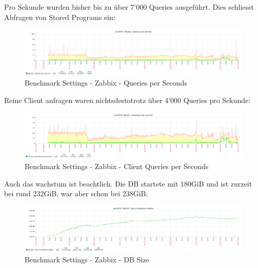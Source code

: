\begin{flushleft}
    Pro Sekunde wurden bisher bis zu über 7'000 Queries ausgeführt.
    Dies schliesst Abfragen von Stored Programs ein:
    \begin{figure}[H]
        \centering
        \includegraphics[width=0.8\linewidth]{source/implementation/evaluation/benchmarking/sks0970_zabbix_mariadb_queries_per_second_graph}
        \caption{Benchmark Settings - Zabbix - Queries per Seconds}
        \label{fig:sks0970_zabbix_mariadb_queries_per_second_graph}
    \end{figure}
    Reine Client anfragen waren nichtsdestotrotz über 4'000 Queries pro Sekunde:
    \begin{figure}[H]
        \centering
        \includegraphics[width=0.8\linewidth]{source/implementation/evaluation/benchmarking/sks0970_zabbix_mariadb_questions_per_second_graph}
        \caption{Benchmark Settings - Zabbix - Client Queries per Seconds}
        \label{fig:sks0970_zabbix_mariadb_questions_per_second_graph}
    \end{figure}
\end{flushleft}
\begin{flushleft}
    Auch das wachstum ist beachtlich.
    Die DB startete mit 180GiB und ist zurzeit bei rund 232GiB, war aber schon bei 238GiB:
    \begin{figure}[H]
        \centering
        \includegraphics[width=0.8\linewidth]{source/implementation/evaluation/benchmarking/sks0970_zabbix_mariadb_size_graph}
        \caption{Benchmark Settings - Zabbix - DB Size}
        \label{fig:sks0970_zabbix_mariadb_size_graph}
    \end{figure}
\end{flushleft}
